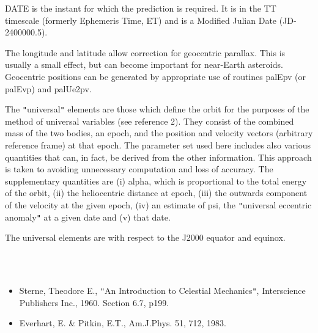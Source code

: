 \documentclass[twoside,11pt]{article}
\renewcommand{\_}{\texttt{\symbol{95}}}
\newcommand{\sstdiytopic}[2]{\item[{\hspace{-0.35em}#1\hspace{-0.35em}:}]
\mbox{} \\[1.3ex] #2}
\newcommand{\sstitemlist}[1]{
  \mbox{} \\
  \vspace{-3.5ex}
  \begin{itemize}
     #1
  \end{itemize}
}
\newcommand{\sstitem}{\item}
\newcommand{\sstdiytopic}[2]{\item[{#1}] #2 }
\newcommand{\sstitemlist}[1]{
      \begin{itemize}
         #1
      \end{itemize}
      \\
   }
\newcommand{\sstitem}{\item}
\begin{document}
{{{         \sstitem
         DATE is the instant for which the prediction is required.  It is
           in the TT timescale (formerly Ephemeris Time, ET) and is a
           Modified Julian Date (JD-2400000.5).

         \sstitem
         The longitude and latitude allow correction for geocentric
           parallax.  This is usually a small effect, but can become
           important for near-Earth asteroids.  Geocentric positions can be
           generated by appropriate use of routines palEpv (or palEvp) and
           palUe2pv.

         \sstitem
         The {\tt "}universal{\tt "} elements are those which define the orbit for the
           purposes of the method of universal variables (see reference 2).
           They consist of the combined mass of the two bodies, an epoch,
           and the position and velocity vectors (arbitrary reference frame)
           at that epoch.  The parameter set used here includes also various
           quantities that can, in fact, be derived from the other
           information.  This approach is taken to avoiding unnecessary
           computation and loss of accuracy.  The supplementary quantities
           are (i) alpha, which is proportional to the total energy of the
           orbit, (ii) the heliocentric distance at epoch, (iii) the
           outwards component of the velocity at the given epoch, (iv) an
           estimate of psi, the {\tt "}universal eccentric anomaly{\tt "} at a given
           date and (v) that date.

         \sstitem
         The universal elements are with respect to the J2000 equator and
           equinox.
      }
   }
   \sstdiytopic{
      See Also
   }{
      \sstitemlist{

         \sstitem
         Sterne, Theodore E., {\tt "}An Introduction to Celestial Mechanics{\tt "},
           Interscience Publishers Inc., 1960.  Section 6.7, p199.

         \sstitem
         Everhart, E. \& Pitkin, E.T., Am.J.Phys. 51, 712, 1983.
      }
   }
}
\end{document}
